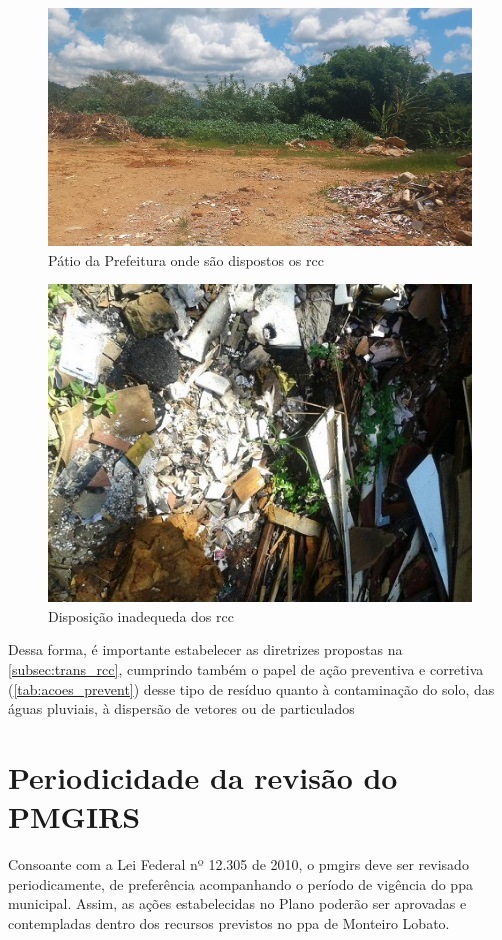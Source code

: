 \begin{figure}[h]
	\centering
	\includegraphics[width=0.7\linewidth]{produtos/prodquatro/patio_rcc}
	\caption{Pátio da Prefeitura onde são dispostos os \gls{rcc}}
	\label{fig:patio_rcc}
\end{figure}

\begin{figure}[h!]
	\centering
	\includegraphics[width=0.6\linewidth]{produtos/prodquatro/rcc}
	\caption{Disposição inadequeda dos \gls{rcc}}
	\label{fig:rcc}
\end{figure}

Dessa forma, é importante estabelecer as diretrizes propostas na \autoref{subsec:trans_rcc}, cumprindo também o papel de ação preventiva e corretiva (\autoref{tab:acoes_prevent}) desse tipo de resíduo quanto à contaminação do solo, das águas pluviais, à dispersão de vetores ou de particulados

\FloatBarrier
\newpage
\section{Periodicidade da revisão do PMGIRS}
\label{sec:revisao_pmgirs}

Consoante com a Lei Federal nº 12.305 de 2010, o \gls{pmgirs} deve ser revisado periodicamente, de preferência acompanhando o período de vigência do \gls{ppa} municipal. Assim, as ações estabelecidas no Plano poderão ser aprovadas e contempladas dentro dos recursos previstos no \gls{ppa} de Monteiro Lobato.

